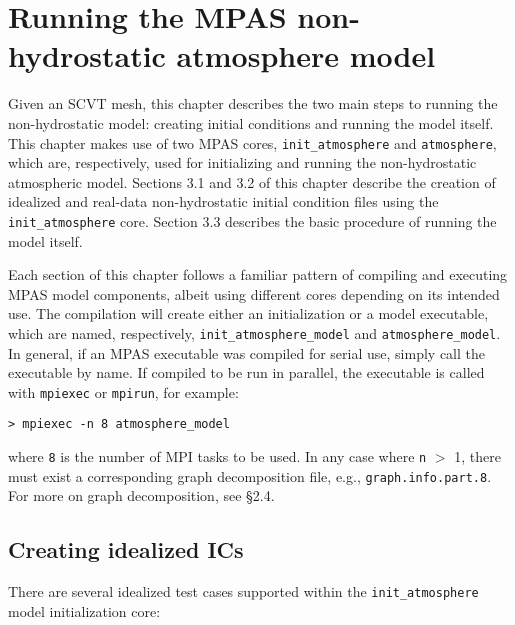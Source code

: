 
\chapter{Running the MPAS non-hydrostatic atmosphere model}

\setlength\LTleft{0.0in}

Given an SCVT mesh, this chapter describes the two main steps to running the non-hydrostatic model: creating initial conditions and running the model itself.  This chapter makes use of two MPAS cores, {\tt init\_atmosphere} and {\tt atmosphere}, which are, respectively, used for initializing and running the non-hydrostatic atmospheric model.  Sections 3.1 and 3.2 of this chapter describe the creation of idealized and real-data non-hydrostatic initial condition files using the {\tt init\_atmosphere} core.   Section 3.3 describes the basic procedure of running the model itself.

Each section of this chapter follows a familiar pattern of compiling and executing MPAS model components, albeit using different cores depending on its intended use.  The compilation will create either an initialization or a model executable, which are named, respectively, {\tt init\_atmosphere\_model} and {\tt atmosphere\_model}.  In general, if an MPAS executable was compiled for serial use, simply call the executable by name. If compiled to be run in parallel, the executable is called with {\tt mpiexec} or {\tt mpirun}, for example:

\vspace{12pt}
{\tt > mpiexec -n 8 atmosphere\_model}
\vspace{12pt}


\noindent where {\tt 8} is the number of MPI tasks to be used.  In any case where {\tt n} $>$ 1, there must exist a corresponding graph decomposition file, e.g., {\tt graph.info.part.8}. For more on graph decomposition, see \S 2.4.  

\section{Creating idealized ICs}

There are several idealized test cases supported within the {\tt init\_atmosphere} model initialization core:

